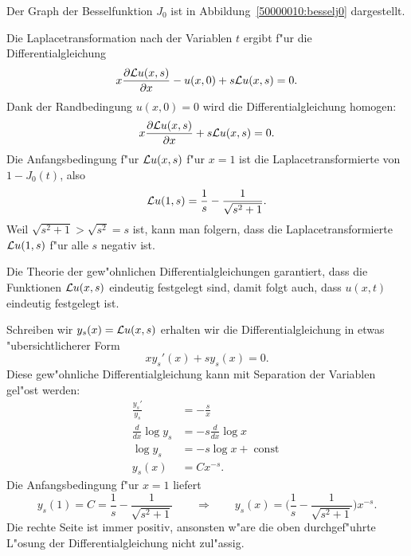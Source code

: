 \begin{loesung}
Der Graph der Besselfunktion $J_0$ ist in Abbildung~\ref{50000010:besselj0}
dargestellt.
\begin{teilaufgaben}
\item
Die Laplacetransformation nach der Variablen $t$
ergibt f"ur die Differentialgleichung
\[
x\frac{\partial{\cal L}u(x,s)}{\partial x}
-
u(x,0)+s{\cal L}u(x,s)=0.
\]
Dank der Randbedingung $u(x,0)=0$ wird die Differentialgleichung
homogen:
\[
x\frac{\partial{\cal L}u(x,s)}{\partial x}
+
s{\cal L}u(x,s)=0.
\]
Die Anfangsbedingung f"ur ${\cal L}u(x,s)$ f"ur $x=1$ ist die
Laplacetransformierte von $1-J_0(t)$, also
\[
{\cal L}u(1,s)=\frac1s-\frac{1}{\sqrt{s^2+1}}.
\]
Weil $\sqrt{s^2+1}>\sqrt{s^2}=s$ ist, kann man folgern, dass
die Laplacetransformierte ${\cal L}u(1,s)$ f"ur alle $s$ negativ ist.
\item
Die Theorie der gew"ohnlichen Differentialgleichungen garantiert, dass
die Funktionen ${\cal L}u(x,s)$ eindeutig festgelegt sind, damit folgt
auch, dass $u(x,t)$ eindeutig festgelegt ist.
\item
Schreiben wir $y_s(x)={\cal L}u(x,s)$ erhalten wir die Differentialgleichung
in etwas "ubersichtlicherer Form
\begin{equation}
xy_s'(x)+sy_s(x)=0.
\label{50000010:sdgl}
\end{equation}
Diese gew"ohnliche Differentialgleichung kann mit Separation der
Variablen gel"ost werden:
\begin{align*}
\frac{y_s'}{y_s}&=-\frac{s}{x}
\\
\frac{d}{dx}\log y_s&=-s\frac{d}{dx}\log x
\\
\log y_s&=-s\log x+\operatorname{const}
\\
y_s(x)&=Cx^{-s}.
\end{align*}
Die Anfangsbedingung f"ur $x=1$ liefert
\begin{equation}
y_s(1)=C=\frac1s-\frac{1}{\sqrt{s^2 + 1}}
\qquad\Rightarrow\qquad
y_s(x)
=
\biggl(\frac1s-\frac{1}{\sqrt{s^2+1}}\biggr)x^{-s}.
\label{50000010:loesung}
\end{equation}
Die rechte Seite ist immer positiv, ansonsten w"are die oben durchgef"uhrte
L"osung der Differentialgleichung nicht zul"assig.
\end{teilaufgaben}
\end{loesung}

